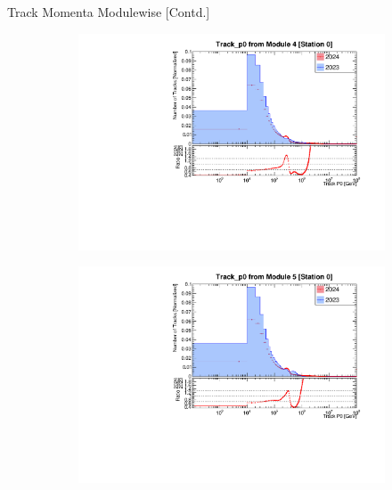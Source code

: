 \begin{frame}{Track Momenta Modulewise [Contd.]}
\begin{figure}
        \begin{subfigure}[t]{0.49\linewidth}
            \includegraphics[width=\linewidth]{./ModuleLevelPlots/Track_p0_st0_module4_linear.pdf}
        \end{subfigure}
        \begin{subfigure}[t]{0.49\linewidth}
            \includegraphics[width=\linewidth]{./ModuleLevelPlots/Track_p0_st0_module5_linear.pdf}
        \end{subfigure}
    \end{figure}
\end{frame}


